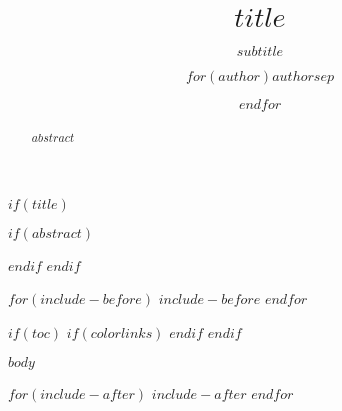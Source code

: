 \documentclass[11pt]{article}
\title{$title$}
\subtitle{$subtitle$}
\author{$for(author)$$author$$sep$ \and $endfor$}
\date$date$/
\begin{document}
$if(title)$
\maketitle

$if(abstract)$
\begin{abstract}
$abstract$
\end{abstract}
$endif$
$endif$

$for(include-before)$
$include-before$
$endfor$

$if(toc)$
{
$if(colorlinks)$
\hypersetup{linkcolor=$if(toccolor)$$toccolor$$else$$endif$}
$endif$
\setcounter{tocdepth}{$toc-depth$}
\tableofcontents
}
$endif$

$body$

$for(include-after)$
$include-after$
$endfor$
\end{document}
